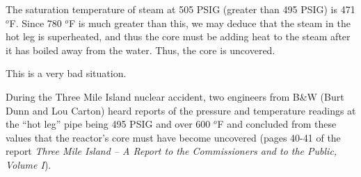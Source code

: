 The saturation temperature of steam at 505 PSIG (greater than 495 PSIG) is 471 $^{o}$F.  Since 780 $^{o}$F is much greater than this, we may deduce that the steam in the hot leg is superheated, and thus the core must be adding heat to the steam after it has boiled away from the water.  Thus, the core is uncovered.
 
\vskip 10pt

This is a very bad situation.







During the Three Mile Island nuclear accident, two engineers from B\&W (Burt Dunn and Lou Carton) heard reports of the pressure and temperature readings at the ``hot leg'' pipe being 495 PSIG and over 600 $^{o}$F and concluded from these values that the reactor's core must have become uncovered (pages 40-41 of the report {\it Three Mile Island -- A Report to the Commissioners and to the Public, Volume I}).




